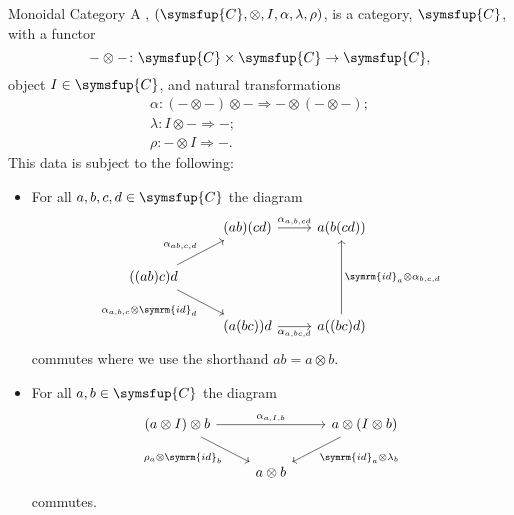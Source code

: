 \documentclass[fleqn]{NotesClass}
\newcommand{\cat}[1]{\symsfup{#1}}
\newcommand{\id}{\symrm{id}}
\newcommand{\natTrans}{\Rightarrow}
\begin{document}
    \begin{dfn}{Monoidal Category}{}
        A , \((\cat{C}, \otimes, I, \alpha, \lambda, \rho)\), is a category, \(\cat{C}\), with a functor
        \begin{equation}
            - \otimes - \colon \cat{C} \times \cat{C} \to \cat{C},
        \end{equation}
        object \(I \in \cat{C}\), and natural transformations
        \begin{gather}
            \alpha \colon (- \otimes -) \otimes - \natTrans - \otimes (- \otimes -);\\
            \lambda \colon I \otimes - \natTrans -;\\
            \rho \colon - \otimes I \natTrans -.
        \end{gather}
        This data is subject to the following:
        \begin{itemize}
            \item For all \(a, b, c, d \in \cat{C}\) the diagram
            \begin{equation}
                \begin{tikzcd}
                    & (ab)(cd) \arrow[r, "{\alpha_{a,b,cd}}"] & a(b(cd))\\
                    ((ab)c)d \arrow[ur, "{\alpha_{ab,c,d}}"] \arrow[dr, "{\alpha_{a,b,c} \otimes \id_d}"']\\
                    & (a(bc))d \arrow[r, "{\alpha_{a,bc,d}}"'] & a((bc)d) \arrow[uu, "{\id_a \otimes \alpha_{b,c,d}}"']
                \end{tikzcd}
            \end{equation}
            commutes where we use the shorthand \(ab = a \otimes b\).
            \item For all \(a, b \in \cat{C}\) the diagram
            \begin{equation}
                \begin{tikzcd}
                    (a \otimes I) \otimes b \arrow[rr, "{\alpha_{a,I,b}}"] \arrow[dr, "\rho_a \otimes \id_b"'] && a \otimes (I \otimes b) \arrow[dl, "\id_a \otimes \lambda_b"]\\
                    & a \otimes b
                \end{tikzcd}
            \end{equation}
            commutes.
        \end{itemize}
    \end{dfn}
    
\end{document}
